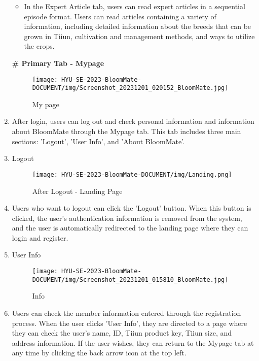 \documentclass[conference, a4paper]{IEEEtran}
\begin{document}
\begin{enumerate}
        \begin{itemize}
            \item In the Expert Article tab, users can read expert articles in a sequential episode format. Users can read articles containing a variety of information, including detailed information about the breeds that can be grown in Tiiun, cultivation and management methods, and ways to utilize the crops. \\
        \end{itemize}
\newline
\textbf{\# Primary Tab - Mypage}
        \begin{figure}[h]
        \centerline{
            \texttt{[image: HYU-SE-2023-BloomMate-DOCUMENT/img/Screenshot\_20231201\_020152\_BloomMate.jpg]}
        }
        \label{fig}
        \caption{My page}
        \end{figure}
\item[]After login, users can log out and check personal information and information about BloomMate through the Mypage tab. This tab includes three main sections: 'Logout', 'User Info', and 'About BloomMate'. \\
    \item Logout
        \begin{figure}[h]
        \centerline{
            \texttt{[image: HYU-SE-2023-BloomMate-DOCUMENT/img/Landing.png]}
        }
        \label{fig}
        \caption{After Logout - Landing Page}
        \end{figure}
    \item[]Users who want to logout can click the 'Logout' button. When this button is clicked, the user's authentication information is removed from the system, and the user is automatically redirected to the landing page where they can login and register. \\
\newpage
    \item User Info
        \begin{figure}[h]
        \centerline{
            \texttt{[image: HYU-SE-2023-BloomMate-DOCUMENT/img/Screenshot\_20231201\_015810\_BloomMate.jpg]}
        }
        \label{fig}
        \caption{Info}
        \end{figure}
    \item[]Users can check the member information entered through the registration process. When the user clicks 'User Info', they are directed to a page where they can check the user's name, ID, Tiiun product key, Tiiun size, and address information. If the user wishes, they can return to the Mypage tab at any time by clicking the back arrow icon at the top left.\\


\end{enumerate}
\end{document}
